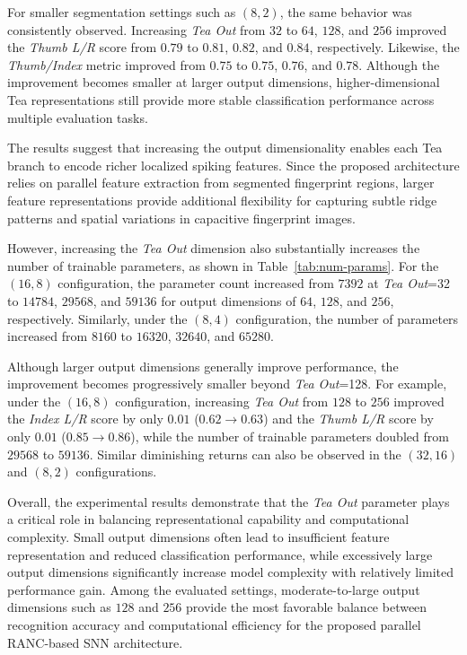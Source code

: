 \documentclass[../main.tex]{subfiles}
\begin{document}
For smaller segmentation settings such as \((8,2)\), the same behavior was consistently observed. Increasing \textit{Tea Out} from \(32\) to \(64\), \(128\), and \(256\) improved the \textit{Thumb L/R} score from \(0.79\) to \(0.81\), \(0.82\), and \(0.84\), respectively. Likewise, the \textit{Thumb/Index} metric improved from \(0.75\) to \(0.75\), \(0.76\), and \(0.78\). Although the improvement becomes smaller at larger output dimensions, higher-dimensional Tea representations still provide more stable classification performance across multiple evaluation tasks.

The results suggest that increasing the output dimensionality enables each Tea branch to encode richer localized spiking features. Since the proposed architecture relies on parallel feature extraction from segmented fingerprint regions, larger feature representations provide additional flexibility for capturing subtle ridge patterns and spatial variations in capacitive fingerprint images.

However, increasing the \textit{Tea Out} dimension also substantially increases the number of trainable parameters, as shown in Table~\ref{tab:num-params}. For the \((16,8)\) configuration, the parameter count increased from \(7392\) at \textit{Tea Out}=32 to \(14784\), \(29568\), and \(59136\) for output dimensions of \(64\), \(128\), and \(256\), respectively. Similarly, under the \((8,4)\) configuration, the number of parameters increased from \(8160\) to \(16320\), \(32640\), and \(65280\).

Although larger output dimensions generally improve performance, the improvement becomes progressively smaller beyond \textit{Tea Out}=128. For example, under the \((16,8)\) configuration, increasing \textit{Tea Out} from \(128\) to \(256\) improved the \textit{Index L/R} score by only \(0.01\) (\(0.62 \rightarrow 0.63\)) and the \textit{Thumb L/R} score by only \(0.01\) (\(0.85 \rightarrow 0.86\)), while the number of trainable parameters doubled from \(29568\) to \(59136\). Similar diminishing returns can also be observed in the \((32,16)\) and \((8,2)\) configurations.

Overall, the experimental results demonstrate that the \textit{Tea Out} parameter plays a critical role in balancing representational capability and computational complexity. Small output dimensions often lead to insufficient feature representation and reduced classification performance, while excessively large output dimensions significantly increase model complexity with relatively limited performance gain. Among the evaluated settings, moderate-to-large output dimensions such as \(128\) and \(256\) provide the most favorable balance between recognition accuracy and computational efficiency for the proposed parallel RANC-based SNN architecture.
\end{document}
